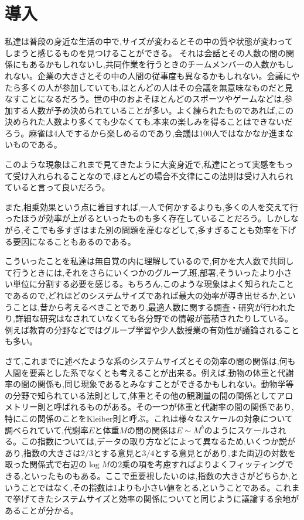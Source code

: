 \chapter{導入}

私達は普段の身近な生活の中で,サイズが変わるとその中の質や状態が変わってしまうと感じるものを見つけることができる。
それは会話とその人数の間の関係にもあるかもしれないし,共同作業を行うときのチームメンバーの人数かもしれない。企業の大きさとその中の人間の従事度も異なるかもしれない。会議にやたら多くの人が参加していても,ほとんどの人はその会議を無意味なものだと見なすことになるだろう。世の中のおよそほとんどのスポーツやゲームなどは,参加する人数が予め決められていることが多い。よく練られたものであれば,この決められた人数より多くても少なくても,本来の楽しみを得ることはできないだろう。麻雀は4人でするから楽しめるのであり,会議は100人ではなかなか進まないものである。

このような現象はこれまで見てきたように大変身近で,私達にとって実感をもって受け入れられることなので,ほとんどの場合不文律にこの法則は受け入れられていると言って良いだろう。

また,相乗効果という点に着目すれば,一人で何かするよりも,多くの人を交えて行ったほうが効率が上がるといったものも多く存在していることだろう。しかしながら,そこでも多すぎはまた別の問題を産むなどして,多すぎることも効率を下げる要因になることもあるのである。

こういったことを私達は無自覚の内に理解しているので,何かを大人数で共同して行うときには,それをさらにいくつかのグループ,班,部署,そういったより小さい単位に分割する必要を感じる。もちろん,このような現象はよく知られたことであるので,どれほどのシステムサイズであれば最大の効率が導き出せるか,ということは,昔から考えるべきことであり,最適人数に関する調査・研究が行われたり,詳細な研究はなされていなくても各分野での情報が蓄積されたりしている。例えば教育の分野などではグループ学習や少人数授業の有効性が議論されることも多い。

さて,これまでに述べたような系のシステムサイズとその効率の間の関係は,何も人間を要素とした系でなくとも考えることが出来る。例えば,動物の体重と代謝率の間の関係も,同じ現象であるとみなすことができるかもしれない。動物学等の分野で知られている法則として,体重とその他の観測量の間の関係としてアロメトリー則と呼ばれるものがある。その一つが体重と代謝率の間の関係であり,特にこの関係のことをKleiber則と呼ぶ。これは様々なスケールの対象について調べられていて,代謝率$E$と体重$M$の間の関係は$E\sim M^{b}$のようにスケールされる。この指数については,データの取り方などによって異なるため,いくつか説があり,指数の大きさは$2/3$とする意見と$3/4$とする意見とがあり,また両辺の対数を取った関係式で右辺の$\log M$の2乗の項を考慮すればよりよくフィッティングできる,といったものもある。ここで重要視したいのは,指数の大きさがどちらか,ということではなく,その指数は1よりも小さい値をとる,ということである。これまで挙げてきたシステムサイズと効率の関係についてと同じように議論する余地があることが分かる。

